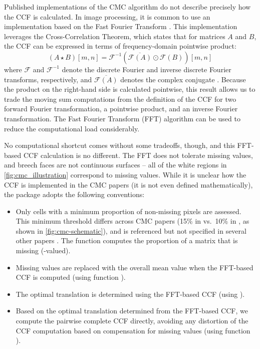 Published implementations of the CMC algorithm do not describe precisely
how the CCF is calculated. In image processing, it is common to use an
implementation based on the Fast Fourier Transform
\citep{Brown92asurvey}. This implementation leverages the
Cross-Correlation Theorem, which states that for matrices \(A\) and
\(B\), the CCF can be expressed in terms of frequency-domain pointwise
product: \[
(A \star B )[m,n]= \mathcal{F}^{-1}\left(\overline{\mathcal{F}(A)} \odot \mathcal{F}(B)\right)[m,n]
\] where \(\mathcal{F}\) and \(\mathcal{F}^{-1}\) denote the discrete
Fourier and inverse discrete Fourier transforms, respectively, and
\(\overline{\mathcal{F}(A)}\) denotes the complex conjugate
\citep{fft_brigham}. Because the product on the right-hand side is
calculated pointwise, this result allows us to trade the moving sum
computations from the definition of the CCF for two forward Fourier
transformation, a pointwise product, and an inverse Fourier
transformation. The Fast Fourier Transform (FFT) algorithm can be used
to reduce the computational load considerably.

No computational shortcut comes without some tradeoffs, though, and this
FFT-based CCF calculation is no different. The FFT does not tolerate
missing values, and breech faces are not continuous surfaces -- all of
the white regions in \autoref{fig:cmc_illustration} correspond to
missing values. While it is unclear how the CCF is implemented in the
CMC papers (it is not even defined mathematically), the 
package adopts the following conventions:

\begin{itemize}
\item
  Only cells with a minimum proportion of non-missing pixels are
  assessed. This minimum threshold differs across CMC papers (15\% in
  \citet{chen_convergence_2017} vs.~10\% in
  \citet{song_estimating_2018}, as shown in
  \autoref{fig:cmc-schematic}), and is referenced but not specified in
  several other papers
  \citep{tong_fired_2014,song_3d_2014,chu_validation_2013}. The
   function computes the proportion of
  a matrix that is missing (-valued).
\item
  Missing values are replaced with the overall mean value when the
  FFT-based CCF is computed (using function
  ).
\item
  The optimal translation is determined using the FFT-based CCF (using
  ).
\item
  Based on the optimal translation determined from the FFT-based CCF, we
  compute the pairwise complete CCF directly, avoiding any distortion of
  the CCF computation based on compensation for missing values (using
  function ).
\end{itemize}

